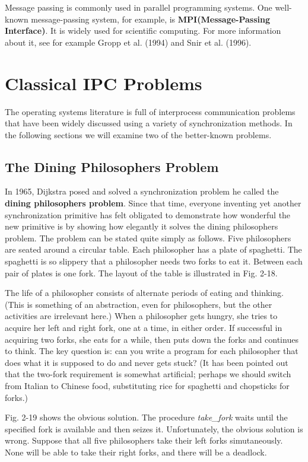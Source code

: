 \documentclass{book}
\newcommand {\kw}  [1] {\textbf{#1}}
\newcommand {\sys} [1] {\textsl{#1}}
\begin{document}
Message passing is commonly used in parallel programming systems.
One well-known message-passing system, for example, is \kw{MPI(Message-Passing Interface)}.
It is widely used for scientific computing.
For more information about it, see for example Gropp et al. (1994) and Snir et al. (1996). 

\section{Classical IPC Problems}
The operating systems literature is full of interprocess communication problems 
that have been widely discussed using a variety of synchronization methods.
In the following sections we will examine two of the better-known problems.

\subsection{The Dining Philosophers Problem}
In 1965, Dijkstra posed and solved a synchronization problem he called the \kw{dining philosophers problem}.
Since that time, everyone inventing yet another synchronization primitive has felt obligated to 
demonstrate how wonderful the new primitive is by showing how elegantly it solves the dining philosophers problem.
The problem can be stated quite simply as follows.
Five philosophers are seated around a circular table.
Each philosopher has a plate of spaghetti.
The spaghetti is so slippery that a philosopher needs two forks to eat it.
Between each pair of plates is one fork.
The layout of the table is illustrated in Fig. 2-18.

The life of a philosopher consists of alternate periods of eating and thinking.
(This is something of an abstraction, even for philosophers, but the other activities are irrelevant here.)
When a philosopher gets hungry, she tries to acquire her left and right fork, one at a time, in either order.
If successful in acquiring two forks, she eats for a while, then puts down the forks and continues to think.
The key question is: can you write a program for each philosopher that does what it is supposed to do and never gets stuck?
(It has been pointed out that the two-fork requirement is somewhat artificial; 
perhaps we should switch from Italian to Chinese food, substituting rice for spaghetti and chopsticks for forks.)

Fig. 2-19 shows the obvious solution.
The procedure \sys{take\_fork} waits until the specified fork is available and then seizes it.
Unfortunately, the obvious solution is wrong.
Suppose that all five philosophers take their left forks simutaneously.
None will be able to take their right forks, and there will be a deadlock.
\end{document}
